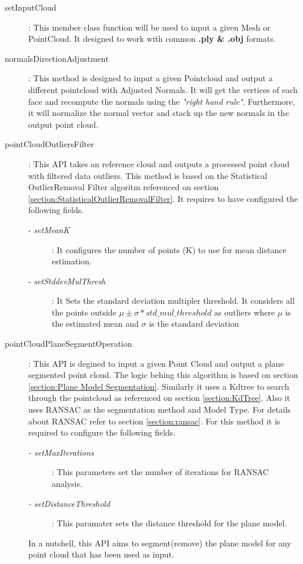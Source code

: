 \documentclass[12pt]{report}
\begin{document}
\begin{description}
  \item[setInputCloud]: This member class function will be used to input a given Mesh or PointCloud. It designed to work with common \textbf{.ply \& .obj} formats.
  \item[normalsDirectionAdjustment]: This method is designed to input a given Pointcloud and output a different pointcloud with Adjusted Normals.
   It will get the vertices of each face and recompute the normals using the \textit{"right hand rule"}. Furthermore, it will normalize the normal vector and stack up the new normals in the output point cloud.
  \item[pointCloudOutliersFilter]: This API takes an reference cloud and outputs a processed point cloud with filtered data outliers. This method is based on the Statistical OutlierRemoval Filter algoritm referenced on section \ref{section:StatisticalOutlierRemovalFilter}. It requires to have configured the following fields.
  \begin{description}
    \item[- \textit{setMeanK}] : It configures the number of points (K) to use for mean distance estimation.
    \item[- \textit{setStddevMulThresh}] : It Sets the standard deviation multipler threshold. It considers all the points outside $\mu \pm \sigma *  std\_mul\_threshold$ as outliers where $\mu$ is the estimated mean and $\sigma$  is the standard deviation     
  \end{description} 
   \item[pointCloudPlaneSegmentOperation]: This API is degined to input a given Point Cloud and output a plane segmented point cloud. The logic behing this algorithm is based on section \ref{section:Plane Model Segmentation}.
   Similarly it uses a Kdtree to search through the pointcloud as referenced on section \ref{section:KdTree}. Also it uses RANSAC  as the segmentation method and Model Type. For details about RANSAC refer to section \ref{section:ransac}.
   For this method it is required to configure the following fields.
   \begin{description}
     \item[\textit{- setMaxIterations}] : This parameters set the number of  iterations for RANSAC  analysis.
     \item[\textit{- setDistanceThreshold}]: This paramater sets the distance threshold for the plane model.
   \end{description}
   In a nutshell, this API aims to segment(remove) the plane model for any point cloud that has been used as input.

\end{description}
\end{document}
